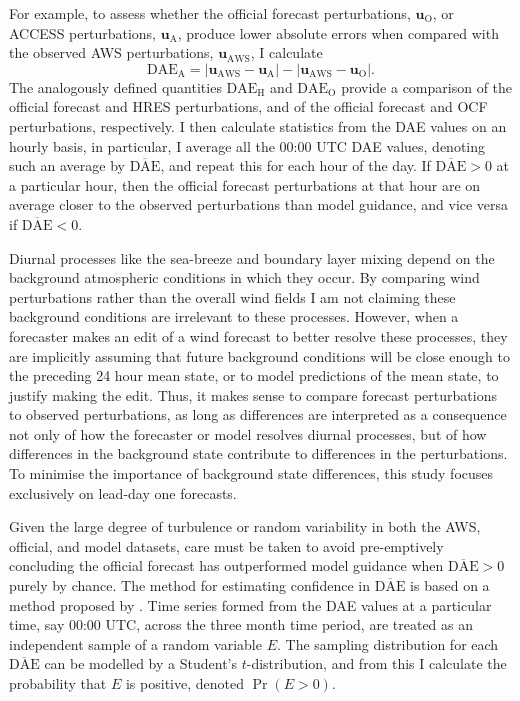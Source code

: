 \documentclass[twocol]{ametsoc}
\DeclareMathOperator{\pr}{Pr}
\begin{document}
For example, to assess whether the official forecast perturbations, $\mathbf{u}_{\text{O}}$, or ACCESS perturbations, $\mathbf{u}_{\text{A}}$, produce lower absolute errors when compared with the observed AWS perturbations, $\mathbf{u}_{\text{AWS}}$, I calculate 
\begin{equation}
\text{DAE}_\text{A} = \left\lvert \mathbf{u}_{\text{AWS}}-\mathbf{u}_{\text{A}} \right\rvert - \left\lvert \mathbf{u}_{\text{AWS}}-\mathbf{u}_{\text{O}} \right\rvert. \label{Eq:DAE}
\end{equation} 
The analogously defined quantities $\text{DAE}_\text{H}$ and $\text{DAE}_\text{O}$ provide a comparison of the official forecast and HRES perturbations, and of the official forecast and OCF perturbations, respectively. I then calculate statistics from the DAE values on an hourly basis, in particular, I average all the 00:00 UTC DAE values, denoting such an average by $\overline{\text{DAE}}$, and repeat this for each hour of the day. If $\overline{\text{DAE}}>0$ at a particular hour, then the official forecast perturbations at that hour are on average closer to the observed perturbations than model guidance, and vice versa if $\overline{\text{DAE}}<0$.

Diurnal processes like the sea-breeze and boundary layer mixing depend on the background atmospheric conditions in which they occur. By comparing wind perturbations rather than the overall wind fields I am not claiming these background conditions are irrelevant to these processes. However, when a forecaster makes an edit of a wind forecast to better resolve these processes, they are implicitly assuming that future background conditions will be close enough to the preceding 24 hour mean state, or to model predictions of the mean state, to justify making the edit. Thus, it makes sense to compare forecast perturbations to observed perturbations, as long as differences are interpreted as a consequence not only of how the forecaster or model resolves diurnal processes, but of how differences in the background state contribute to differences in the perturbations. To minimise the importance of background state differences, this study focuses exclusively on lead-day one forecasts.

Given the large degree of turbulence or random variability in both the AWS, official, and model datasets, care must be taken to avoid pre-emptively concluding the official forecast has outperformed model guidance when $\overline{\text{DAE}}>0$ purely by chance. The method for estimating confidence in $\overline{\text{DAE}}$ is based on a method proposed by \citet{griffiths17}. Time series formed from the DAE values at a particular time, say 00:00 UTC, across the three month time period, are treated as an independent sample of a random variable $E$. The sampling distribution for each $\overline{\text{DAE}}$ can be modelled by a Student's $t$-distribution, and from this I calculate the probability that $E$ is positive, denoted $\pr\left(E > 0\right)$. 
\end{document}
